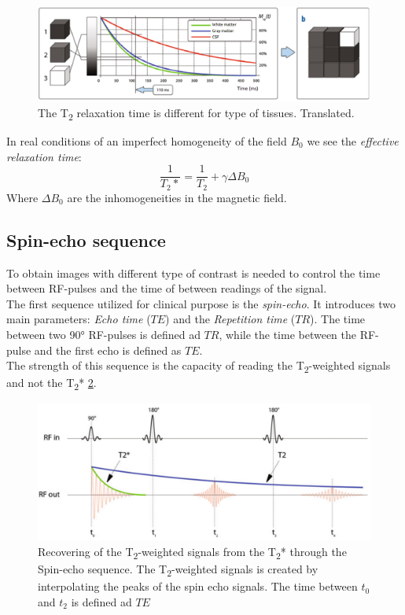  \begin{figure}[h]
    \centering
    \includegraphics[width=1\textwidth]{images/t2_relax_tissues.png}
    \caption{The T\textsubscript{2} relaxation time is different for type of tissues. \cite{elementiRisonanza} Translated.}
    \label{fig:T2_relax_tissues}
 \end{figure}

 \noindent In real conditions of an imperfect homogeneity of the field $B_0$ we see the \emph{effective relaxation time}:
 \begin{equation}
    \frac{1}{T_{2}*} = \frac{1}{T_2}+\gamma\Delta B_0
 \end{equation}
 Where $\Delta B_0$ are the inhomogeneities in the magnetic field.

 \subsection{Spin-echo sequence}
 To obtain images with different type of contrast is needed to control the time between RF-pulses and the time of between readings of the signal. \\
 The first sequence utilized for clinical purpose is the \emph{spin-echo}. It introduces two main parameters: \emph{Echo time} ($TE$) and the \emph{Repetition time} ($TR$). The time between two 90° RF-pulses is defined ad $TR$, while the time between the RF-pulse and the first echo is defined as $TE$.\\
 The strength of this sequence is the capacity of reading the T\textsubscript{2}-weighted signals and not the T\textsubscript{2}* \ref{fig:T2vsT2*}.

 \begin{figure}[h]
    \centering
    \includegraphics[width=1\textwidth]{images/t2vst2star.png}
    \caption{Recovering of the T\textsubscript{2}-weighted signals from the T\textsubscript{2}* through the Spin-echo sequence. The T\textsubscript{2}-weighted signals is created by interpolating the peaks of the spin echo signals. The time between $t_0$ and $t_2$ is defined ad $TE$ \cite{elementiRisonanza}}
    \label{fig:T2vsT2*}
 \end{figure}

